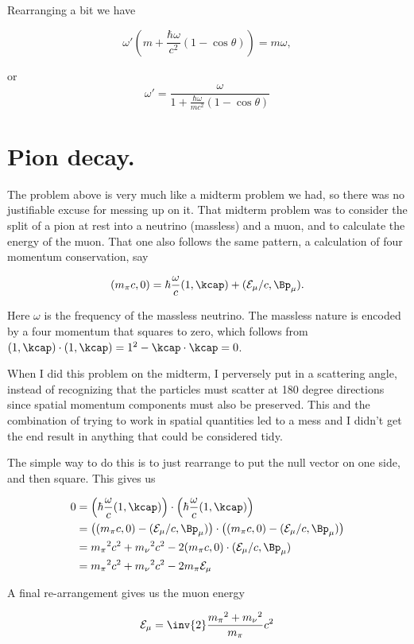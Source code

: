 Rearranging a bit we have

\begin{equation}\label{eqn:relativisticElectrodynamicsExamReflection:430}
\omega' \left( m + \frac{\hbar \omega}{c^2} ( 1 - \cos\theta ) \right) = m \omega,
\end{equation}

or
\begin{equation}\label{eqn:relativisticElectrodynamicsExamReflection:450}
\omega' = \frac{\omega}{
1 + \frac{\hbar \omega}{m c^2} ( 1 - \cos\theta ) 
}
\end{equation}

\section{Pion decay.}

The problem above is very much like a midterm problem we had, so there was no justifiable excuse for messing up on it.  That midterm problem was to consider the split of a pion at rest into a neutrino (massless) and a muon, and to calculate the energy of the muon.  That one also follows the same pattern, a calculation of four momentum conservation, say

\begin{equation}\label{eqn:relativisticElectrodynamicsExamReflection:720}
(m_\pi c, 0) = \hbar \frac{\omega}{c}(1, \kcap) + ( \mathcal{E}_\mu/c, \Bp_\mu ).
\end{equation}

Here $\omega$ is the frequency of the massless neutrino.  The massless nature is encoded by a four momentum that squares to zero, which follows from $(1, \kcap) \cdot (1, \kcap) = 1^2 - \kcap \cdot \kcap = 0$.

When I did this problem on the midterm, I perversely put in a scattering angle, instead of recognizing that the particles must scatter at 180 degree directions since spatial momentum components must also be preserved.  This and the combination of trying to work in spatial quantities led to a mess and I didn't get the end result in anything that could be considered tidy.

The simple way to do this is to just rearrange to put the null vector on one side, and then square.  This gives us

\begin{align*}
0 &=
\left(\hbar \frac{\omega}{c}(1, \kcap) \right) \cdot
\left(\hbar \frac{\omega}{c}(1, \kcap) \right) \\
&=
\left( (m_\pi c, 0) - ( \mathcal{E}_\mu/c, \Bp_\mu ) \right) \cdot \left( (m_\pi c, 0) - ( \mathcal{E}_\mu/c, \Bp_\mu ) \right) \\
&=
{m_\pi}^2 c^2 + {m_\nu}^2 c^2 - 2 (m_\pi c, 0) \cdot ( \mathcal{E}_\mu/c, \Bp_\mu ) \\
&=
{m_\pi}^2 c^2 + {m_\nu}^2 c^2 - 2 m_\pi \mathcal{E}_\mu
\end{align*}

A final re-arrangement gives us the muon energy

\begin{equation}\label{eqn:relativisticElectrodynamicsExamReflection:740}
\mathcal{E}_\mu = \inv{2} \frac{ {m_\pi}^2 + {m_\nu}^2 }{m_\pi} c^2
\end{equation}

\EndNoBibArticle

